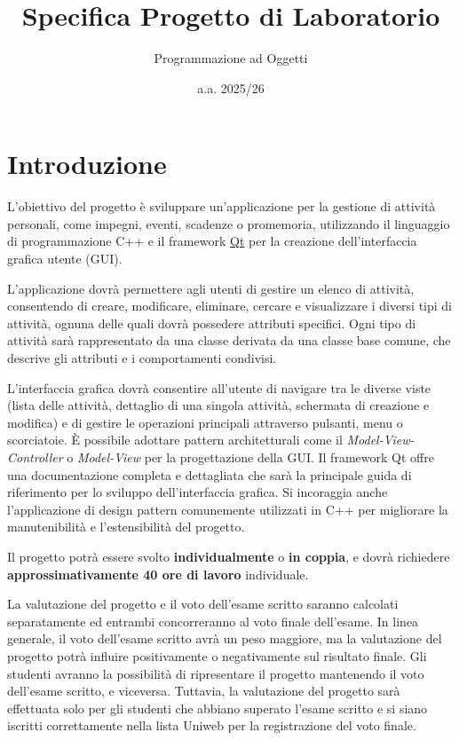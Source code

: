 \documentclass[10pt,a4paper,oneside]{article}
\title{Specifica Progetto di Laboratorio}
\author{Programmazione ad Oggetti}
\date{a.a. 2025/26}
\begin{document}
\maketitle

\section{Introduzione}
L'obiettivo del progetto è sviluppare un'applicazione per la gestione di attività personali, come impegni, eventi, scadenze o promemoria, utilizzando il linguaggio di programmazione C++ e il framework \href{https://www.qt.io/?hsLang=en}{Qt} per la creazione dell'interfaccia grafica utente (GUI).

L'applicazione dovrà permettere agli utenti di gestire un elenco di attività, consentendo di creare, modificare, eliminare, cercare e visualizzare i diversi tipi di attività, ognuna delle quali dovrà possedere attributi specifici. Ogni tipo di attività sarà rappresentato da una classe derivata da una classe base comune, che descrive gli attributi e i comportamenti condivisi.

L'interfaccia grafica dovrà consentire all'utente di navigare tra le diverse viste (lista delle attività, dettaglio di una singola attività, schermata di creazione e modifica) e di gestire le operazioni principali attraverso pulsanti, menu o scorciatoie. È possibile adottare pattern architetturali come il \emph{Model-View-Controller} o \emph{Model-View} per la progettazione della GUI. Il framework Qt offre una documentazione completa e dettagliata che sarà la principale guida di riferimento per lo sviluppo dell'interfaccia grafica. Si incoraggia anche l'applicazione di design pattern comunemente utilizzati in C++ per migliorare la manutenibilità e l'estensibilità del progetto.

Il progetto potrà essere svolto \textbf{individualmente} o \textbf{in coppia}, e dovrà richiedere \textbf{approssimativamente 40 ore di lavoro} individuale.

La valutazione del progetto e il voto dell'esame scritto saranno calcolati separatamente ed entrambi concorreranno al voto finale dell'esame. In linea generale, il voto dell'esame scritto avrà un peso maggiore, ma la valutazione del progetto potrà influire positivamente o negativamente sul risultato finale. Gli studenti avranno la possibilità di ripresentare il progetto mantenendo il voto dell'esame scritto, e viceversa. Tuttavia, la valutazione del progetto sarà effettuata solo per gli studenti che abbiano superato l'esame scritto e si siano iscritti correttamente nella lista Uniweb per la registrazione del voto finale.
\end{document}
